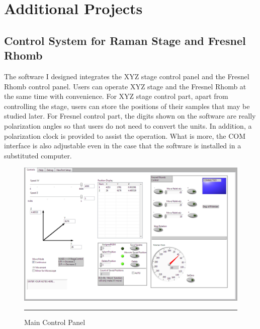 
\chapter{Additional Projects} %
\label{Chapter5}


\section{Control System for Raman Stage and Fresnel Rhomb} 
The software I designed integrates the XYZ stage control panel and the Fresnel Rhomb control panel. Users can operate XYZ stage and the Fresnel Rhomb at the same time with convenience.
    For XYZ stage control part, apart from controlling the stage, users can store the positions of their samples that may be studied later.
    For Fresnel control part, the digits shown on the software are really polarization angles so that users do not need to convert the units. In addition, a polarization clock is provided to assist the operation. What is more, the COM interface is also adjustable even in the case that the software is installed in a substituted computer.

\begin{figure}[htbp]
         \small
	\centering
		\includegraphics[width=13cm]{./Figures/panel.png}
		\rule{35em}{0.5pt}
	\caption[An Electron]{Main Control Panel}
	\label{fig:Electron}
\end{figure}
